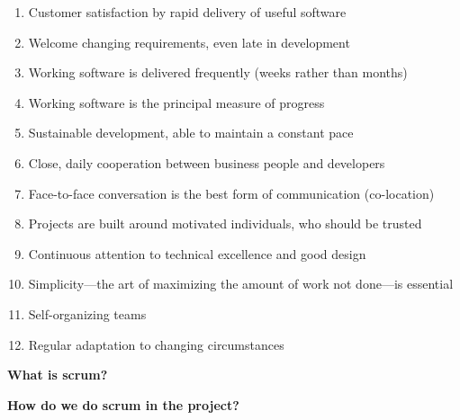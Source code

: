 \begin{enumerate}
    \item Customer satisfaction by rapid delivery of useful software
    \item Welcome changing requirements, even late in development
    \item Working software is delivered frequently (weeks rather than months)
    \item Working software is the principal measure of progress
    \item Sustainable development, able to maintain a constant pace
    \item Close, daily cooperation between business people and developers
    \item Face-to-face conversation is the best form of communication (co-location)
    \item Projects are built around motivated individuals, who should be trusted
    \item Continuous attention to technical excellence and good design
    \item Simplicity—the art of maximizing the amount of work not done—is essential
    \item Self-organizing teams
    \item Regular adaptation to changing circumstances
\end{enumerate}


{\bf What is scrum? }


{\bf How do we do scrum in the project? }


